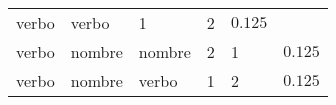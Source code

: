 \documentclass[12pt,spanish,a4paper,]{article}
\begin{document}
\begin{longtable}[]{@{}llllll@{}}
\begin{minipage}[t]{0.13\columnwidth}
verbo\strut
\end{minipage} & \begin{minipage}[t]{0.13\columnwidth}\raggedright
verbo\strut
\end{minipage} & \begin{minipage}[t]{0.07\columnwidth}\raggedright
1\strut
\end{minipage} & \begin{minipage}[t]{0.07\columnwidth}\raggedright
2\strut
\end{minipage} & \begin{minipage}[t]{0.32\columnwidth}\raggedright
\(0.125\)\strut
\end{minipage}\tabularnewline
\begin{minipage}[t]{0.13\columnwidth}\raggedright
verbo\strut
\end{minipage} & \begin{minipage}[t]{0.13\columnwidth}\raggedright
nombre\strut
\end{minipage} & \begin{minipage}[t]{0.13\columnwidth}\raggedright
nombre\strut
\end{minipage} & \begin{minipage}[t]{0.07\columnwidth}\raggedright
2\strut
\end{minipage} & \begin{minipage}[t]{0.07\columnwidth}\raggedright
1\strut
\end{minipage} & \begin{minipage}[t]{0.32\columnwidth}\raggedright
\(0.125\)\strut
\end{minipage}\tabularnewline
\begin{minipage}[t]{0.13\columnwidth}\raggedright
verbo\strut
\end{minipage} & \begin{minipage}[t]{0.13\columnwidth}\raggedright
nombre\strut
\end{minipage} & \begin{minipage}[t]{0.13\columnwidth}\raggedright
verbo\strut
\end{minipage} & \begin{minipage}[t]{0.07\columnwidth}\raggedright
1\strut
\end{minipage} & \begin{minipage}[t]{0.07\columnwidth}\raggedright
2\strut
\end{minipage} & \begin{minipage}[t]{0.32\columnwidth}\raggedright
\(0.125\)\strut
\end{minipage}\tabularnewline

\end{longtable}
\end{document}

